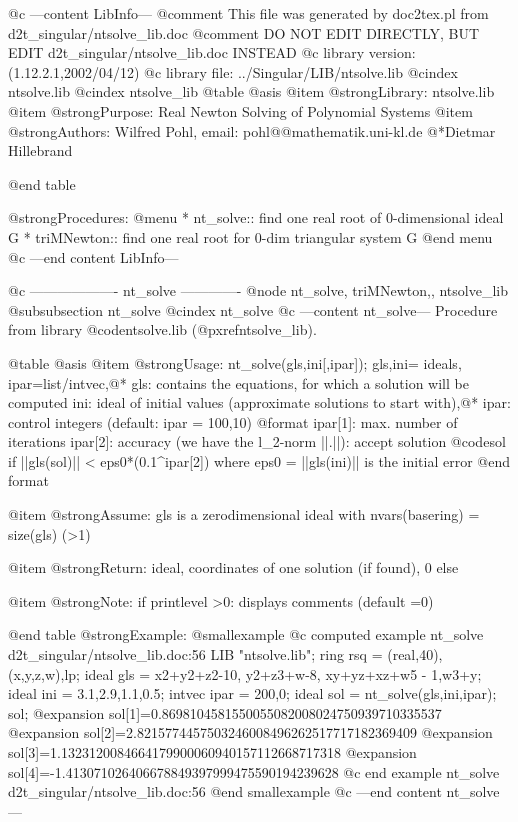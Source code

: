 @c ---content LibInfo---
@comment This file was generated by doc2tex.pl from d2t_singular/ntsolve_lib.doc
@comment DO NOT EDIT DIRECTLY, BUT EDIT d2t_singular/ntsolve_lib.doc INSTEAD
@c library version: (1.12.2.1,2002/04/12)
@c library file: ../Singular/LIB/ntsolve.lib
@cindex ntsolve.lib
@cindex ntsolve_lib
@table @asis
@item @strong{Library:}
ntsolve.lib
@item @strong{Purpose:}
     Real Newton Solving of Polynomial Systems
@item @strong{Authors:}
Wilfred Pohl, email: pohl@@mathematik.uni-kl.de
@*Dietmar Hillebrand

@end table

@strong{Procedures:}
@menu
* nt_solve:: find one real root of 0-dimensional ideal G
* triMNewton:: find one real root for 0-dim triangular system G
@end menu
@c ---end content LibInfo---

@c ------------------- nt_solve -------------
@node nt_solve, triMNewton,, ntsolve_lib
@subsubsection nt_solve
@cindex nt_solve
@c ---content nt_solve---
Procedure from library @code{ntsolve.lib} (@pxref{ntsolve_lib}).

@table @asis
@item @strong{Usage:}
nt_solve(gls,ini[,ipar]); gls,ini= ideals, ipar=list/intvec,@*
gls: contains the equations, for which a solution will be computed
ini: ideal of initial values (approximate solutions to start with),@*
ipar: control integers (default: ipar = 100,10)
  @format
 ipar[1]: max. number of iterations
 ipar[2]: accuracy (we have the l_2-norm ||.||): accept solution @code{sol}
          if ||gls(sol)|| < eps0*(0.1^ipar[2])
          where eps0 = ||gls(ini)|| is the initial error
  @end format

@item @strong{Assume:}
gls is a zerodimensional ideal with nvars(basering) = size(gls) (>1)

@item @strong{Return:}
ideal, coordinates of one solution (if found), 0 else

@item @strong{Note:}
if printlevel >0: displays comments (default =0)

@end table
@strong{Example:}
@smallexample
@c computed example nt_solve d2t_singular/ntsolve_lib.doc:56 
LIB "ntsolve.lib";
ring rsq = (real,40),(x,y,z,w),lp;
ideal gls =  x2+y2+z2-10, y2+z3+w-8, xy+yz+xz+w5 - 1,w3+y;
ideal ini = 3.1,2.9,1.1,0.5;
intvec ipar = 200,0;
ideal sol = nt_solve(gls,ini,ipar);
sol;
@expansion{} sol[1]=0.8698104581550055082008024750939710335537
@expansion{} sol[2]=2.8215774457503246008496262517717182369409
@expansion{} sol[3]=1.1323120084664179900060940157112668717318
@expansion{} sol[4]=-1.413071026406678849397999475590194239628
@c end example nt_solve d2t_singular/ntsolve_lib.doc:56
@end smallexample
@c ---end content nt_solve---

